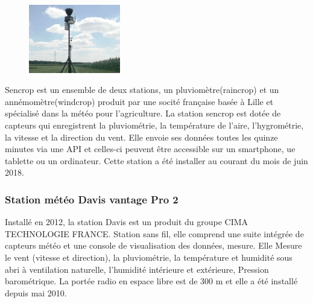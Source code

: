 \begin{figure}
\includegraphics[width=4cm]{images/imageRang3.jpg}
\end{figure}
Sencrop est un ensemble de deux stations, un pluviomètre(raincrop) et un annémomètre(windcrop) produit par une socité française basée à Lille et spécialisé dans la météo pour l’agriculture. La station sencrop est dotée de capteurs qui enregistrent la pluviométrie, la température de l’aire, l’hygrométrie, la vitesse et la direction du vent. Elle envoie ses données toutes les quinze minutes via une API et celles-ci peuvent être accessible sur un smartphone, ue tablette ou un ordinateur. Cette station a été installer au courant du mois de juin 2018. 

\subsubsection{Station météo Davis vantage Pro 2}

Installé en 2012, la station Davis est un produit du groupe CIMA TECHNOLOGIE FRANCE. Station sans fil, elle comprend une suite intégrée de capteurs météo et une console de visualisation des données, mesure. Elle Mesure le vent (vitesse et direction), la pluviométrie, la température et humidité sous abri à ventilation naturelle, l'humidité intérieure et extérieure, Pression barométrique. La portée radio en espace libre est de 300 m et elle a été installé depuis mai 2010. 


